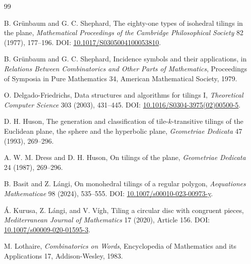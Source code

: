 \documentclass[11pt]{article}
\begin{document}
\begin{thebibliography}{99}

B. Gr\"unbaum and G. C. Shephard,
\newblock The eighty-one types of isohedral tilings in the plane,
\newblock \emph{Mathematical Proceedings of the Cambridge Philosophical Society} 82 (1977), 177--196.
\newblock DOI: \href{https://doi.org/10.1017/S0305004100053810}{10.1017/S0305004100053810}.

B. Gr\"unbaum and G. C. Shephard,
\newblock Incidence symbols and their applications,
\newblock in \emph{Relations Between Combinatorics and Other Parts of Mathematics}, Proceedings of Symposia in Pure Mathematics 34, American Mathematical Society, 1979.

O. Delgado-Friedrichs,
\newblock Data structures and algorithms for tilings I,
\newblock \emph{Theoretical Computer Science} 303 (2003), 431--445.
\newblock DOI: \href{https://doi.org/10.1016/S0304-3975(02)00500-5}{10.1016/S0304-3975(02)00500-5}.

D. H. Huson,
\newblock The generation and classification of tile-$k$-transitive tilings of the Euclidean plane, the sphere and the hyperbolic plane,
\newblock \emph{Geometriae Dedicata} 47 (1993), 269--296.

A. W. M. Dress and D. H. Huson,
\newblock On tilings of the plane,
\newblock \emph{Geometriae Dedicata} 24 (1987), 269--296.

B. Basit and Z. L\'angi,
\newblock On monohedral tilings of a regular polygon,
\newblock \emph{Aequationes Mathematicae} 98 (2024), 535--555.
\newblock DOI: \href{https://doi.org/10.1007/s00010-023-00973-y}{10.1007/s00010-023-00973-y}.

\'A. Kurusa, Z. L\'angi, and V. V\'igh,
\newblock Tiling a circular disc with congruent pieces,
\newblock \emph{Mediterranean Journal of Mathematics} 17 (2020), Article 156.
\newblock DOI: \href{https://doi.org/10.1007/s00009-020-01595-3}{10.1007/s00009-020-01595-3}.

M. Lothaire,
\newblock \emph{Combinatorics on Words},
\newblock Encyclopedia of Mathematics and its Applications 17, Addison-Wesley, 1983.

\end{thebibliography}
\end{document}
